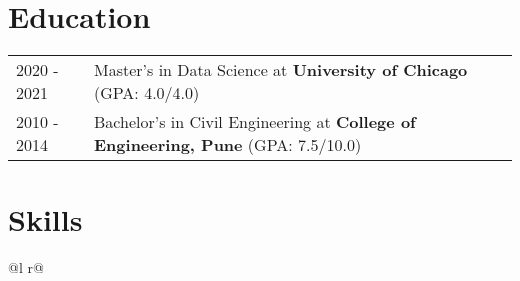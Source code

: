 \documentclass[a4paper,10pt]{article}
\begin{document}

\section{Education}
\begin{tabularx}{\linewidth}{@{}l X@{}}	
2020 - 2021 & Master's in Data Science at \textbf{University of Chicago} \hfill \normalsize (GPA: 4.0/4.0) \\

2010 - 2014 & Bachelor's in Civil Engineering at \textbf{College of Engineering, Pune} \hfill (GPA: 7.5/10.0) \\ 

\end{tabularx}


\section{Skills}

\begin{tabularx}{\linewidth}{ @{}l r@{} }
\end{tabularx}

\vfill
\end{document}
